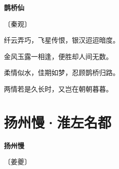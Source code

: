 \documentclass[12pt,UTF-8,openany,fontset=none]{ctexbook}
\begin{document}
\begin{center}
    {\bfseries 鹊桥仙}

    \vspace{18pt}

    \begin{large}\xuwen
        〔秦观〕
    \end{large}

\end{center}

    \vspace{18pt}  %

\begin{center}
    \begin{Large}

        纤云弄巧，飞星传恨，银汉迢迢暗度。

        金风玉露一相逢，便胜却人间无数。

        \vspace{18pt}  %

        柔情似水，佳期如梦，忍顾鹊桥归路。

        两情若是久长时，又岂在朝朝暮暮。

    \end{Large}

\end{center}

\vspace{8pt}
\clearpage

\section{扬州慢·淮左名都}


\begin{center}
    {\bfseries 扬州慢}

    \vspace{18pt}

    \begin{large}\xuwen
        〔姜夔〕
    \end{large}

\end{center}

    \vspace{18pt}  %
\end{document}
